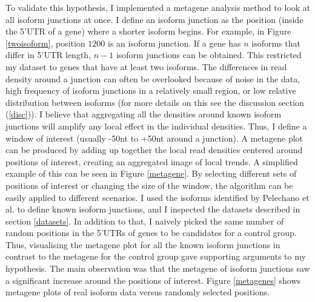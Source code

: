 \documentclass[12pt]{article}
\begin{document}
To validate this hypothesis, I implemented a metagene analysis method to look at all isoform junctions at once. I define an isoform junction as the position (inside the 5'UTR of a gene) where a shorter isoform begins. For example, in Figure \ref{twoisoform}, position $1200$ is an isoform junction. If a gene has $n$ isoforms that differ in 5'UTR length, $n - 1$ isoform junctions can be obtained. This restricted my dataset to genes that have at least two isoforms. The differences in read density around a junction can often be overlooked because of noise in the data, high frequency of isoform junctions in a relatively small region, or low relative distribution between isoforms (for more details on this see the discussion section (\ref{disc})). I believe that aggregating all the densities around known isoform junctions will amplify any local effect in the individual densities. Thus, I define a window of interest (usually -50nt to +50nt around a junction). A metagene plot can be produced by adding up together the local read densities centered around positions of interest, creating an aggregated image of local trends.  A simplified example of this can be seen in Figure \ref{metagene}. By selecting different sets of positions of interest or changing the size of the window, the algorithm can be easily applied to different scenarios. I used the isoforms identified by Pelechano et al. \cite{Pelechano2013} to define known isoform junctions, and I inspected the datasets described in section \ref{datasets}. In addition to that, I naively picked the same number of random positions in the 5'UTRs of genes to be candidates for a control group. Thus, visualising the metagene plot for all the known isoform junctions in contrast to the metagene for the control group gave supporting arguments to my hypothesis. The main observation was that the metagene of isoform junctions saw a significant increase around the positions of interest. Figure \ref{metagenes} shows metagene plots of real isoform data versus randomly selected positions.  



\end{document}
